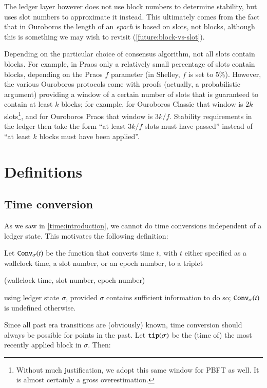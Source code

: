 The ledger layer however does not use block numbers to determine stability, but
uses slot numbers to approximate it instead. This ultimately comes from the fact
that in Ouroboros the length of an \emph{epoch} is based on slots, not blocks,
although this is something we may wish to revisit (\cref{future:block-vs-slot}).

Depending on the particular choice of consensus algorithm, not all slots contain
blocks. For example, in Praos only a relatively small percentage of slots
contain blocks, depending on the Praos $f$ parameter (in Shelley, $f$ is set to
5\%). However,  the various Ouroboros protocols come with proofs (actually, a
probabilistic argument) providing a window of a certain number of slots that is
guaranteed to contain at least $k$ blocks; for example, for Ouroboros Classic
that window is $2k$ slots\footnote{Without much justification, we adopt this
same window for PBFT as well. It is almost certainly a gross overestimation.},
and for Ouroboros Praos that window is $3k/f$. Stability requirements in the
ledger then take the form ``at least $3k/f$ slots must have passed'' instead of
``at least $k$ blocks must have been applied''.

\section{Definitions}

\subsection{Time conversion}

As we saw in \cref{time:introduction}, we cannot do time conversions independent
of a ledger state. This motivates the following definition:

\begin{definition}
Let $\mathtt{Conv}_{\sigma}(t)$ be the function that converts time $t$, with $t$
either specified as a wallclock time, a slot number, or an epoch number, to a
triplet
\begin{center}
(wallclock time, slot number, epoch number)
\end{center}
using ledger state $\sigma$, provided $\sigma$ contains sufficient information
to do so; $\mathtt{Conv}_{\sigma}(t)$ is undefined otherwise.
\end{definition}

Since all past era transitions are (obviously) known, time conversion should
always be possible for points in the past. Let $\mathtt{tip}(\sigma)$ be the (time
of) the most recently applied block in $\sigma$. Then:

